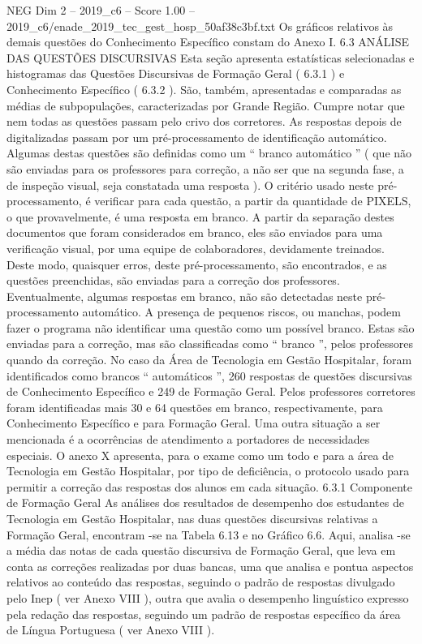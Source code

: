 \begin{textsample}{NEG Dim 2 – 2019\_c6 – Score 1.00 – 2019\_c6/enade\_2019\_tec\_gest\_hosp\_50af38c3bf.txt}
Os gráficos relativos às demais questões do Conhecimento Específico constam do Anexo I. 6.3 ANÁLISE DAS QUESTÕES DISCURSIVAS Esta seção apresenta estatísticas selecionadas e histogramas das Questões Discursivas de Formação Geral ( 6.3.1 ) e Conhecimento Específico ( 6.3.2 ).
São, também, apresentadas e comparadas as médias de subpopulações, caracterizadas por Grande Região.
Cumpre notar que nem todas as questões passam pelo crivo dos corretores.
As respostas depois de digitalizadas passam por um pré-processamento de identificação automático.
Algumas destas questões são definidas como um “ branco automático ” ( que não são enviadas para os professores para correção, a não ser que na segunda fase, a de inspeção visual, seja constatada uma resposta ).
O critério usado neste pré-processamento, é verificar para cada questão, a partir da quantidade de PIXELS, o que provavelmente, é uma resposta em branco.
A partir da separação destes documentos que foram considerados em branco, eles são enviados para uma verificação visual, por uma equipe de colaboradores, devidamente treinados.
Deste modo, quaisquer erros, deste pré-processamento, são encontrados, e as questões preenchidas, são enviadas para a correção dos professores.
Eventualmente, algumas respostas em branco, não são detectadas neste pré-processamento automático.
A presença de pequenos riscos, ou manchas, podem fazer o programa não identificar uma questão como um possível branco.
Estas são enviadas para a correção, mas são classificadas como “ branco ”, pelos professores quando da correção.
No caso da Área de Tecnologia em Gestão Hospitalar, foram identificados como brancos “ automáticos ”, 260 respostas de questões discursivas de Conhecimento Específico e 249 de Formação Geral.
Pelos professores corretores foram identificadas mais 30 e 64 questões em branco, respectivamente, para Conhecimento Específico e para Formação Geral.
Uma outra situação a ser mencionada é a ocorrências de atendimento a portadores de necessidades especiais.
O anexo X apresenta, para o exame como um todo e para a área de Tecnologia em Gestão Hospitalar, por tipo de deficiência, o protocolo usado para permitir a correção das respostas dos alunos em cada situação. 6.3.1 Componente de Formação Geral As análises dos resultados de desempenho dos estudantes de Tecnologia em Gestão Hospitalar, nas duas questões discursivas relativas a Formação Geral, encontram -se na Tabela 6.13 e no Gráfico 6.6.
Aqui, analisa -se a média das notas de cada questão discursiva de Formação Geral, que leva em conta as correções realizadas por duas bancas, uma que analisa e pontua aspectos relativos ao conteúdo das respostas, seguindo o padrão de respostas divulgado pelo Inep ( ver Anexo VIII ), outra que avalia o desempenho linguístico expresso pela redação das respostas, seguindo um padrão de respostas específico da área de Língua Portuguesa ( ver Anexo VIII ).

\end{textsample}
